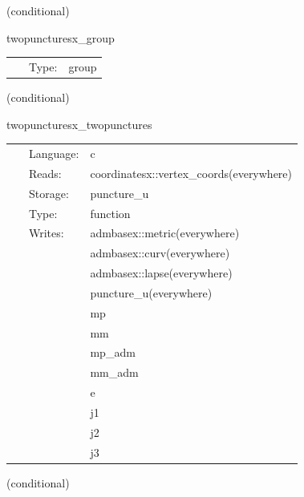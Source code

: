   (conditional) 

\hspace{5mm} twopuncturesx\_group 

\hspace{5mm}{\it twopuncturesx initial data group } 


\hspace{5mm}

 \begin{tabular*}{160mm}{cll} 
~ & Type:  & group \\ 
\end{tabular*} 


\vspace{5mm}

   (conditional) 

\hspace{5mm} twopuncturesx\_twopunctures 

\hspace{5mm}{\it create puncture black hole initial data } 


\hspace{5mm}

 \begin{tabular*}{160mm}{cll} 
~ & Language:  & c \\ 
~ & Reads:  & coordinatesx::vertex\_coords(everywhere) \\ 
~ & Storage:  & puncture\_u \\ 
~ & Type:  & function \\ 
~ & Writes:  & admbasex::metric(everywhere) \\ 
~& ~ &admbasex::curv(everywhere)\\ 
~& ~ &admbasex::lapse(everywhere)\\ 
~& ~ &puncture\_u(everywhere)\\ 
~& ~ &mp\\ 
~& ~ &mm\\ 
~& ~ &mp\_adm\\ 
~& ~ &mm\_adm\\ 
~& ~ &e\\ 
~& ~ &j1\\ 
~& ~ &j2\\ 
~& ~ &j3\\ 
\end{tabular*} 


\vspace{5mm}

   (conditional) 

